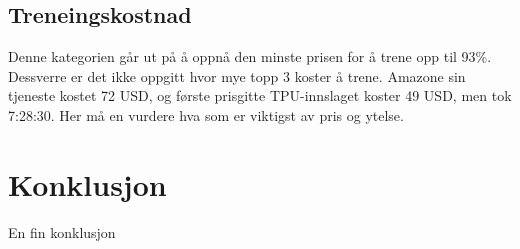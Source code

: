 \subsection{Treneingskostnad}
Denne kategorien går ut på å oppnå den minste prisen for å trene opp til 93\%. Dessverre er det ikke oppgitt hvor mye topp 3 koster å trene. Amazone sin tjeneste kostet 72 USD, og første prisgitte TPU-innslaget koster 49 USD, men tok 7:28:30. Her må en vurdere hva som er viktigst av pris og ytelse.

\newpage
\section{Konklusjon}
En fin konklusjon

\printbibliography
